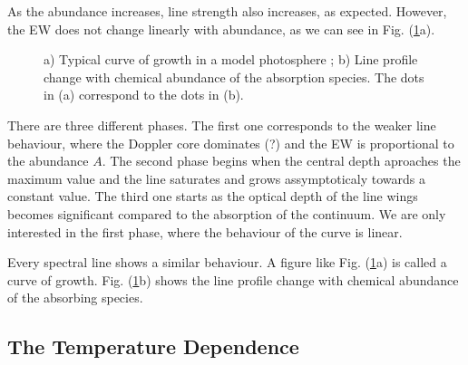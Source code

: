 \documentclass[dvips,12pt,a4paper]{report}
\begin{document}
{As the abundance increases, line strength also increases, as expected. However, the EW does not change linearly with abundance, as we can see in Fig. (\ref{cog}a). 
\begin{figure}[h]
\centering
{}
\caption[EW and Profile dependence of abundance] {a) Typical curve of growth in a model photosphere ; b) Line profile change with chemical abundance of the absorption species. The dots in (a) correspond to the dots in (b).}
\label{cog}
\end{figure}

There are three different phases. The first one corresponds to the weaker line behaviour, where the Doppler core dominates (?) and the EW is proportional to the abundance $A$. The second phase begins when the central depth aproaches the maximum value and the line saturates and grows assymptoticaly towards a constant value. The third one starts as the optical depth of the line wings becomes significant compared to the absorption of the continuum. We are only interested in the first phase, where the behaviour of the curve is linear.

Every spectral line shows a similar behaviour. A figure like Fig. (\ref{cog}a) is called a curve of growth. Fig. (\ref{cog}b) shows the line profile change with chemical abundance of the absorbing species.

\subsection{The Temperature Dependence}

}
\end{document}
